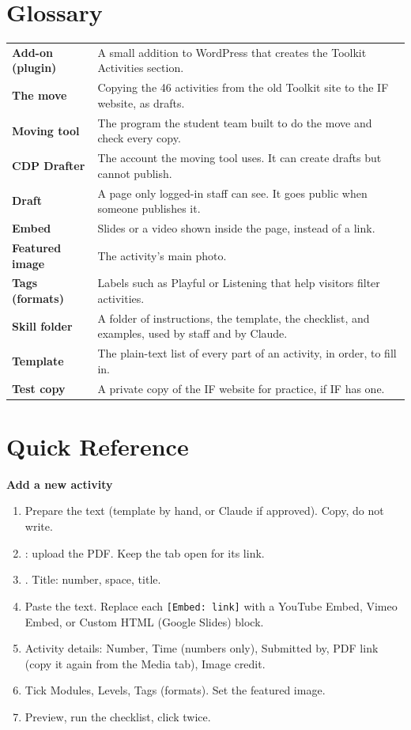 \section{Glossary}
\begin{tabularx}{\textwidth}{@{}>{\bfseries}P{3.6cm}L@{}}
Add-on (plugin) & A small addition to WordPress that creates the Toolkit Activities section. \\
The move & Copying the 46 activities from the old Toolkit site to the IF website, as drafts. \\
Moving tool & The program the student team built to do the move and check every copy. \\
CDP Drafter & The account the moving tool uses. It can create drafts but cannot publish. \\
Draft & A page only logged-in staff can see. It goes public when someone publishes it. \\
Embed & Slides or a video shown inside the page, instead of a link. \\
Featured image & The activity's main photo. \\
Tags (formats) & Labels such as Playful or Listening that help visitors filter activities. \\
Skill folder & A folder of instructions, the template, the checklist, and examples, used by staff and by Claude. \\
Template & The plain-text list of every part of an activity, in order, to fill in. \\
Test copy & A private copy of the IF website for practice, if IF has one. \\
\end{tabularx}

\newpage
\section{Quick Reference}
\textbf{Add a new activity}
\begin{enumerate}
  \item Prepare the text (template by hand, or Claude if approved). Copy, do not write.
  \item {}: upload the PDF. Keep the tab open for its link.
  \item {}. Title: number, space, title.
  \item Paste the text. Replace each \texttt{[Embed: link]} with a YouTube Embed, Vimeo Embed, or Custom HTML (Google Slides) block.
  \item Activity details: Number, Time (numbers only), Submitted by, PDF link (copy it again from the Media tab), Image credit.
  \item Tick Modules, Levels, Tags (formats). Set the featured image.
  \item Preview, run the checklist, click  twice.
\end{enumerate}

